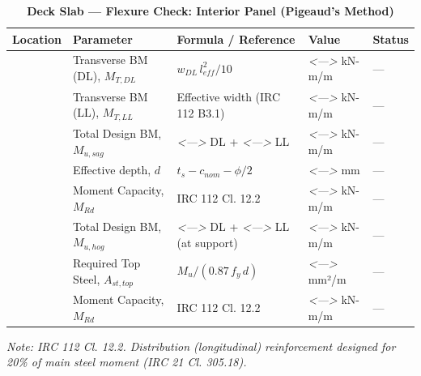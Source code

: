 \documentclass[12pt,a4paper]{report}
\numberwithin{table}{chapter}
\numberwithin{figure}{chapter}
\newcommand{\placeholder}[1]{\textit{\textless #1\textgreater}}
\begin{document}
\vspace{1em}
\begin{longtable}{|C{3.0cm}|C{3.5cm}|C{3.0cm}|>{\centering\arraybackslash}p{4.2cm}|C{1.8cm}|}
\caption{\textbf{Deck Slab --- Flexure Check: Interior Panel (Pigeaud's Method)}}
\hline
\textbf{Location} & \textbf{Parameter} & \textbf{Formula / Reference} & \textbf{Value} & \textbf{Status} \\[6pt]
\hline
{} & Transverse BM (DL), $M_{T,DL}$ & $w_{DL}\,l_{eff}^2/10$ & \placeholder{---} kN-m/m & --- \\[6pt]
 & Transverse BM (LL), $M_{T,LL}$ & Effective width (IRC 112 B3.1) & \placeholder{---} kN-m/m & --- \\[6pt]
 & Total Design BM, $M_{u,sag}$ & \placeholder{---} DL + \placeholder{---} LL & \placeholder{---} kN-m/m & --- \\[6pt]
 & Effective depth, $d$ & $t_s - c_{nom} - \phi/2$ & \placeholder{---} mm & --- \\[6pt]
 & Moment Capacity, $M_{Rd}$ & IRC 112 Cl. 12.2 & \placeholder{---} kN-m/m & --- \\[6pt]
\hline
{} & Total Design BM, $M_{u,hog}$ & \placeholder{---} DL + \placeholder{---} LL (at support) & \placeholder{---} kN-m/m & --- \\[6pt]
 & Required Top Steel, $A_{st,top}$ & $M_u / (0.87\,f_y\,d)$ & \placeholder{---} mm²/m & --- \\[6pt]
 & Moment Capacity, $M_{Rd}$ & IRC 112 Cl. 12.2 & \placeholder{---} kN-m/m & --- \\[6pt]
\hline
\end{longtable}
\noindent\textit{Note: IRC 112 Cl. 12.2. Distribution (longitudinal) reinforcement designed for 20\% of main steel moment (IRC 21 Cl. 305.18).}
\end{document}
